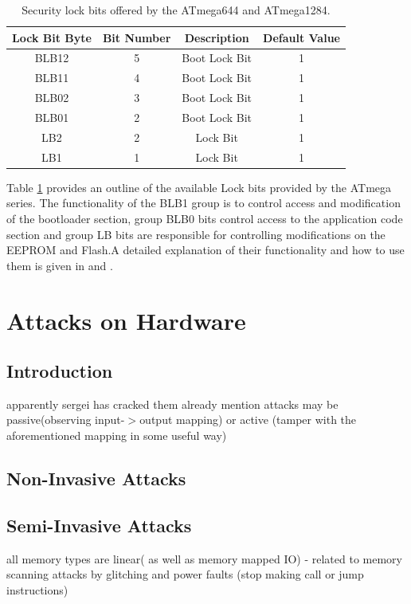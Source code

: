 \documentclass[12pt,a4paper,twocolumn]{article}
\begin{document}
	\begin{table}
		\center
		\begin{tabular}{| c | c | c | c |}
			\hline
			\textbf{Lock Bit Byte} & \textbf{Bit Number} & \textbf{Description} & \textbf{Default Value}\\
			\hline \hline
			BLB12 & 5 & Boot Lock Bit & 1\\
			BLB11 & 4 & Boot Lock Bit & 1\\
			BLB02 & 3 & Boot Lock Bit & 1\\
			BLB01 & 2 & Boot Lock Bit & 1\\
			LB2 & 2 & Lock Bit & 1 \\
			LB1 & 1 & Lock Bit & 1 \\
			\hline
		\end{tabular}
		\caption{Security lock bits offered by the ATmega644 and ATmega1284.}
		\label{table:lock_bits}
	\end{table}
	
Table \ref{table:lock_bits}	 provides an outline of the available Lock bits provided by the ATmega series. The functionality of the BLB1 group is to control access and modification of the bootloader section, group BLB0 bits control access to the application code section and group LB bits are responsible for controlling modifications on the EEPROM and Flash.A detailed explanation of their functionality and how to use them is given in \citep{atmega1284_manual} and \citep{atmega644_manual}.
	
\section{Attacks on Hardware}
\label{sec:curr_attacks}
	\subsection{Introduction}
		apparently sergei has cracked them already \cite{website:scorobogatov_breaking_copy_protection}
	mention attacks may be passive(observing input-$>$output mapping) or active (tamper with the aforementioned mapping in some useful way)
	\subsection{Non-Invasive Attacks}
	\subsection{Semi-Invasive Attacks}
		all memory types are linear( as well as memory mapped IO) - related to memory scanning attacks by glitching and power faults (stop making call or jump instructions)
\end{document}
